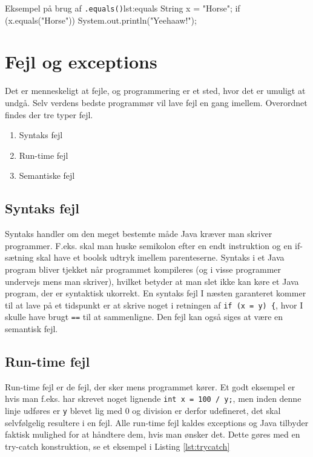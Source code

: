 \begin{JavaCode}{Eksempel på brug af \texttt{.equals()}}{lst:equals}
	String x = "Horse";
	if (x.equals("Horse")) {
		System.out.println("Yeehaaw!");
	}
\end{JavaCode}

\section{Fejl og exceptions}
Det er menneskeligt at fejle, og programmering er et sted, hvor det er umuligt at undgå. Selv verdens bedste programmør vil lave fejl en gang imellem. Overordnet findes der tre typer fejl.

\begin{enumerate}
	\item Syntaks fejl
	\item Run-time fejl
	\item Semantiske fejl
\end{enumerate}

\subsection{Syntaks fejl}
Syntaks handler om den meget bestemte måde Java kræver man skriver programmer. F.eks. skal man huske semikolon efter en endt instruktion og en if-sætning skal have et boolsk udtryk imellem parenteserne. Syntaks i et Java program bliver tjekket når programmet kompileres (og i visse programmer undervejs mens man skriver), hvilket betyder at man slet ikke kan køre et Java program, der er syntaktisk ukorrekt. En syntaks fejl I næsten garanteret kommer til at lave på et tidspunkt er at skrive noget i retningen af \texttt{if (x = y) \{}, hvor I skulle have brugt \texttt{==} til at sammenligne. Den fejl kan også siges at være en semantisk fejl.

\subsection{Run-time fejl}
Run-time fejl er de fejl, der sker mens programmet kører. Et godt eksempel er hvis man f.eks. har skrevet noget lignende \texttt{int x = 100 / y;}, men inden denne linje udføres er \texttt{y} blevet lig med 0 og division er derfor udefineret, det skal selvfølgelig resultere i en fejl. Alle run-time fejl kaldes exceptions og Java tilbyder faktisk mulighed for at håndtere dem, hvis man ønsker det. Dette gøres med en try-catch konstruktion, se et eksempel i Listing \ref{lst:trycatch}

